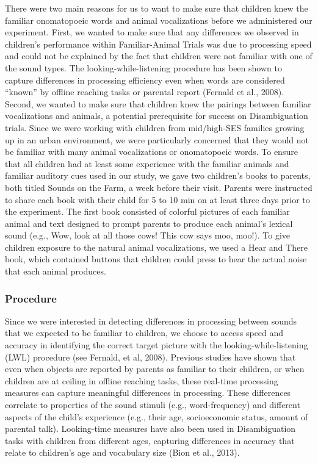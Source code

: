 \documentclass[english,floatsintext,man]{apa6}
\theoremstyle{definition}
\theoremstyle{definition}
\theoremstyle{definition}
\theoremstyle{remark}
\begin{document}
There were two main reasons for us to want to make sure that children
knew the familiar onomatopoeic words and animal vocalizations before we
administered our experiment. First, we wanted to make sure that any
differences we observed in children's performance within Familiar-Animal
Trials was due to processing speed and could not be explained by the
fact that children were not familiar with one of the sound types. The
looking-while-listening procedure has been shown to capture differences
in processing efficiency even when words are considered \enquote{known}
by offline reaching tasks or parental report (Fernald et al., 2008).
Second, we wanted to make sure that children knew the pairings between
familiar vocalizations and animals, a potential prerequisite for success
on Disambiguation trials. Since we were working with children from
mid/high-SES families growing up in an urban environment, we were
particularly concerned that they would not be familiar with many animal
vocalizations or onomatopoeic words. To ensure that all children had at
least some experience with the familiar animals and familiar auditory
cues used in our study, we gave two children's books to parents, both
titled Sounds on the Farm, a week before their visit. Parents were
instructed to share each book with their child for 5 to 10 min on at
least three days prior to the experiment. The first book consisted of
colorful pictures of each familiar animal and text designed to prompt
parents to produce each animal's lexical sound (e.g., Wow, look at all
those cows! This cow says moo, moo!). To give children exposure to the
natural animal vocalizations, we used a Hear and There book, which
contained buttons that children could press to hear the actual noise
that each animal produces.

\subsubsection{Procedure}\label{procedure}

Since we were interested in detecting differences in processing between
sounds that we expected to be familiar to children, we choose to access
speed and accuracy in identifying the correct target picture with the
looking-while-listening (LWL) procedure (see Fernald, et al, 2008).
Previous studies have shown that even when objects are reported by
parents as familiar to their children, or when children are at ceiling
in offline reaching tasks, these real-time processing measures can
capture meaningful differences in processing. These differences
correlate to properties of the sound stimuli (e.g., word-frequency) and
different aspects of the child's experience (e.g., their age,
socioeconomic status, amount of parental talk). Looking-time measures
have also been used in Disambiguation tasks with children from different
ages, capturing differences in accuracy that relate to children's age
and vocabulary size (Bion et al., 2013).
\end{document}

